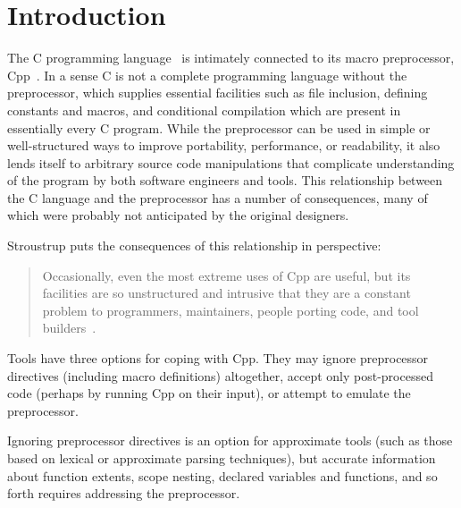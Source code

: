 \documentclass[11pt]{article}
\begin{document}
\bigskip

\section{Introduction}

The C programming language~\cite{ansi} is intimately connected to its macro
preprocessor, Cpp~\cite[Ch.~3]{Harbison91}.  In a sense C is not a complete
programming language without the preprocessor, which supplies essential
facilities such as file inclusion, defining constants and macros, and
conditional compilation which are present in essentially every C program.
While the preprocessor can be used in simple or well-structured ways to
improve portability, performance, or readability, it also lends itself to
arbitrary source code manipulations that complicate understanding of the
program by both software engineers and tools.  This relationship between
the C language and the preprocessor has a number of consequences, many of
which were probably not anticipated by the original designers.

Stroustrup puts the consequences of this relationship in perspective:
\begin{quote}
Occasionally, even the most extreme uses of Cpp are useful, but its
facilities are so unstructured and intrusive that they are a constant
problem to programmers, maintainers, people porting code, and tool
builders~\cite[p.~424]{Stroustrup-DesignEvolution}.
\end{quote}

Tools have three options for coping with Cpp.  They may ignore preprocessor
directives (including macro definitions) altogether, accept only post-processed
code (perhaps by running Cpp on their input), or attempt to emulate the
preprocessor.

Ignoring preprocessor directives is an option for approximate tools
(such as those based on lexical or approximate parsing
techniques), but accurate information about function extents, scope
nesting, declared variables and functions, and so forth requires
addressing the preprocessor.
\end{document}
